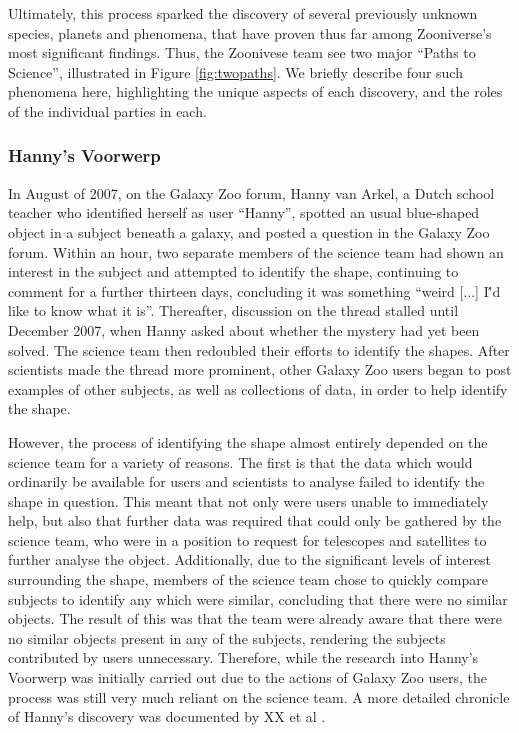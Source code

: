 \documentclass{sigchi}
\begin{document}
Ultimately, this process sparked the discovery of several previously unknown species, planets and phenomena, that have proven thus far among Zooniverse's most significant findings.  Thus, the Zoonivese team see two major ``Paths to Science'', illustrated in Figure \ref{fig:twopaths}. We briefly describe four such phenomena here, highlighting the unique aspects of each discovery, and the roles of the individual parties in each.

\subsubsection{Hanny's Voorwerp}
In August of 2007, on the Galaxy Zoo forum, Hanny van Arkel, a Dutch school teacher who identified herself as user ``Hanny'', spotted an usual blue-shaped object in a subject beneath a galaxy, and posted a question in the Galaxy Zoo forum. Within an hour, two separate members of the science team had shown an interest in the subject and attempted to identify the shape, continuing to comment for a further thirteen days, concluding it was something ``weird [...] I\''d like to know what it is''. Thereafter, discussion on the thread stalled until December 2007, when Hanny asked about whether the mystery had yet been solved. The science team then redoubled their efforts to identify the shapes. After scientists made the thread more prominent, other Galaxy Zoo users began to post examples of other subjects, as well as collections of data, in order to help identify the shape. 

However, the process of identifying the shape almost entirely depended on the science team for a variety of reasons. The first is that the data which would ordinarily be available for users and scientists to analyse failed to identify the shape in question. This meant that not only were users unable to immediately help, but also that further data was required that could only be gathered by the science team, who were in a position to request for telescopes and satellites to further analyse the object. Additionally, due to the significant levels of interest surrounding the shape, members of the science team chose to quickly compare subjects to identify any which were similar, concluding that there were no similar objects. The result of this was that the team were already aware that there were no similar objects present in any of the subjects, rendering the subjects contributed by users unnecessary. Therefore, while the research into Hanny's Voorwerp was initially carried out due to the actions of Galaxy Zoo users, the process was still very much reliant on the science team.  A more detailed chronicle of Hanny's discovery was documented by XX et al \cite{}.
\end{document}

